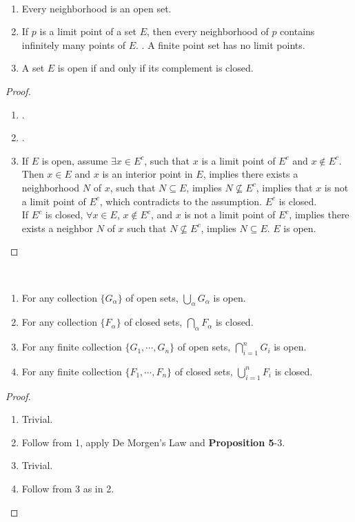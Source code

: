 \begin{prop} ~
\begin{enumerate}
    \item Every neighborhood is an open set.
    \item If $p$ is a limit point of a set $E$, then every neighborhood of $p$ contains infinitely many points of $E$.
    . A finite point set has no limit points.
    \item A set $E$ is open if and only if its complement is closed.
\end{enumerate}
\end{prop}
\begin{proof}
\begin{enumerate} ~
    \item .
    \item .
    \item If $E$ is open, assume $\exists x \in E^{c}$, such that $x$ is a limit point of $E^{c}$ and $x \notin E^{c}$. \\ Then $x \in E$ and $x$ is an interior point in $E$, implies there exists a neighborhood $N$ of $x$, such that $N \subseteq E$, implies $N \not\subseteq E^{c}$, implies that $x$ is not a limit point of $E^{c}$, which contradicts to the assumption. $E^{c}$ is closed. 
    \\If $E^{c}$ is closed, $\forall x \in E$, $x \notin E^{c}$, and $x$ is not a limit point of $E^{c}$, implies there exists a neighbor $N$ of $x$ such that $N \not \subseteq E^{c}$, implies $N \subseteq E$. $E$ is open.
\end{enumerate}
\end{proof}

\begin{prop} ~
\begin{enumerate}
    \item For any collection $\{ G_{\alpha} \}$ of open sets, $\bigcup_{\alpha} G_{\alpha}$ is open.
    \item For any collection $\{ F_{\alpha} \}$ of closed sets, $\bigcap_{\alpha} F_{\alpha}$ is closed.
    \item For any finite collection $\{ G_1, \cdots ,G_n \}$ of open sets, $\bigcap_{i=1}^n G_{i}$ is open.
    \item For any finite collection $\{ F_1, \cdots ,F_n \}$ of closed sets, $\bigcup_{i=1}^n F_{i}$ is closed.
\end{enumerate}
\end{prop}
\begin{proof} ~
\begin{enumerate}
    \item Trivial.
    \item Follow from 1, apply De Morgen's Law and \textbf{Proposition 5}-3.
    \item Trivial.
    \item Follow from 3 as in 2.
\end{enumerate}
\end{proof}

